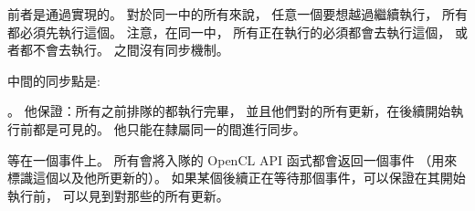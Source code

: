 前者是通過實現的。
對於同一中的所有來說，
任意一個要想越過繼續執行，
所有都必須先執行這個。
注意，在同一中，
所有正在執行的必須都會去執行這個，
或者都不會去執行。
之間沒有同步機制。

中間的同步點是:
\startigBase
\item {}。
他保證：所有之前排隊的都執行完畢，
並且他們對的所有更新，在後續開始執行前都是可見的。
他只能在隸屬同一的間進行同步。

\item 等在一個事件上。
所有會將入隊的 OpenCL API 函式都會返回一個事件
（用來標識這個以及他所更新的）。
如果某個後續正在等待那個事件，可以保證在其開始執行前，
可以見到對那些的所有更新。
\stopigBase

